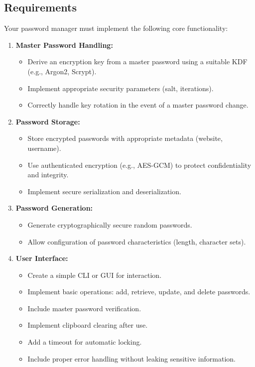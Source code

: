 \documentclass[10pt,a4paper,american]{exam}
\begin{document}
\subsection*{Requirements}
Your password manager must implement the following core functionality:

\begin{enumerate}
	\item \textbf{Master Password Handling:}
	      \begin{itemize}
		      \item Derive an encryption key from a master password using a suitable KDF (e.g., Argon2, Scrypt).
		      \item Implement appropriate security parameters (salt, iterations).
		      \item Correctly handle key rotation in the event of a master password change.
	      \end{itemize}

	\item \textbf{Password Storage:}
	      \begin{itemize}
		      \item Store encrypted passwords with appropriate metadata (website, username).
		      \item Use authenticated encryption (e.g., AES-GCM) to protect confidentiality and integrity.
		      \item Implement secure serialization and deserialization.
	      \end{itemize}

	\item \textbf{Password Generation:}
	      \begin{itemize}
		      \item Generate cryptographically secure random passwords.
		      \item Allow configuration of password characteristics (length, character sets).
	      \end{itemize}

	\item \textbf{User Interface:}
	      \begin{itemize}
		      \item Create a simple CLI or GUI for interaction.
		      \item Implement basic operations: add, retrieve, update, and delete passwords.
		      \item Include master password verification.
		      \item Implement clipboard clearing after use.
		      \item Add a timeout for automatic locking.
		      \item Include proper error handling without leaking sensitive information.
	      \end{itemize}
\end{enumerate}
\end{document}
